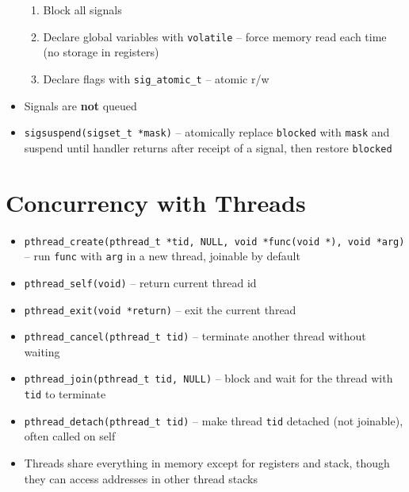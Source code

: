\documentclass[twocolumn]{article}
\begin{document}
\begin{itemize}[noitemsep]
\begin{enumerate}
        \item Block all signals
        \item Declare global variables with \texttt{volatile} -- force memory read each time (no storage in registers)
        \item Declare flags with \texttt{sig\_atomic\_t} -- atomic r/w
    \end{enumerate}
    \item Signals are \textbf{not} queued
    \item \texttt{sigsuspend(sigset\_t *mask)} -- atomically replace \texttt{blocked} with \texttt{mask} and suspend until handler returns after receipt of a signal, then restore \texttt{blocked}
\end{itemize}

\section{Concurrency with Threads}
\begin{itemize}[noitemsep]
\item \texttt{pthread\_create(pthread\_t *tid, NULL, void *func(void *), void *arg)} -- run \texttt{func} with \texttt{arg} in a new thread, joinable by default
\item \texttt{pthread\_self(void)} -- return current thread id
\item \texttt{pthread\_exit(void *return)} -- exit the current thread
\item \texttt{pthread\_cancel(pthread\_t tid)} -- terminate another thread without waiting
\item \texttt{pthread\_join(pthread\_t tid, NULL)} -- block and wait for the thread with \texttt{tid} to terminate
\item \texttt{pthread\_detach(pthread\_t tid)} -- make thread \texttt{tid} detached (not joinable), often called on self
\item Threads share everything in memory except for registers and stack, though they can access addresses in other thread stacks
\end{itemize}

\vfill
\end{document}
